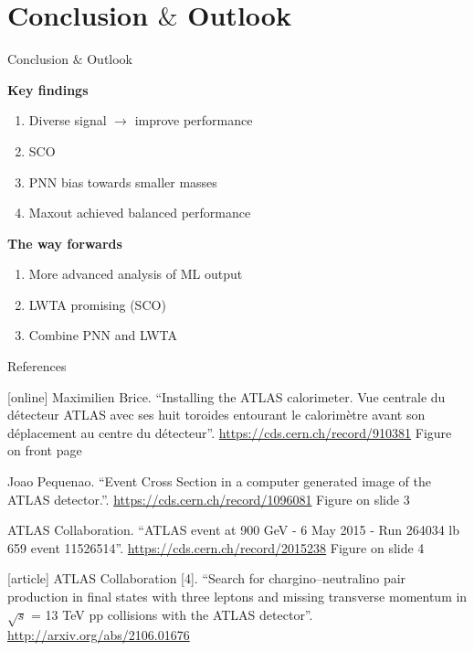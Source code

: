 \documentclass[UKenglish]{beamer}
\begin{document}
\section{Conclusion $\&$ Outlook}
\begin{frame}{Conclusion $\&$ Outlook}
    \tableofcontents[currentsection]
\end{frame}
\begin{frame}
    \textbf{Key findings}
    \begin{enumerate}
        \item Diverse signal $\rightarrow$ improve performance
        \item SCO 
        \item PNN bias towards smaller masses
        \item Maxout achieved balanced performance
    \end{enumerate}
    \vfill
    \textbf{The way forwards}
    \begin{enumerate}
        \item More advanced analysis of ML output
        \item LWTA promising (SCO)
        \item Combine PNN and LWTA
    \end{enumerate}
\end{frame}





\begin{frame}{References}
    \begin{thebibliography}{}
        \scriptsize
        [online]
        Maximilien Brice.
        \newblock \enquote{Installing the ATLAS calorimeter. Vue centrale du
        détecteur ATLAS avec ses huit toroides entourant le
        calorimètre avant son déplacement au centre du
        détecteur}.
        \newblock \url{https://cds.cern.ch/record/910381}
        \newblock Figure on front page

        Joao Pequenao.
        \newblock \enquote{Event Cross Section in a computer generated image of the ATLAS detector.}.
        \newblock \url{https://cds.cern.ch/record/1096081}
        \newblock Figure on slide 3

        ATLAS Collaboration.
        \newblock \enquote{ATLAS event at 900 GeV - 6 May 2015 - Run 264034 lb 659
        event 11526514}.
        \newblock \url{https://cds.cern.ch/record/2015238}
        \newblock Figure on slide 4

        [article]
        ATLAS Collaboration [4].
        \newblock \enquote{Search for chargino--neutralino pair production in final states with three leptons and missing transverse momentum in {$\sqrt{s}$} = 13 {TeV} pp collisions with the {ATLAS} detector}.
        \newblock \url{http://arxiv.org/abs/2106.01676}

    \end{thebibliography}
\end{frame}
\end{document}

